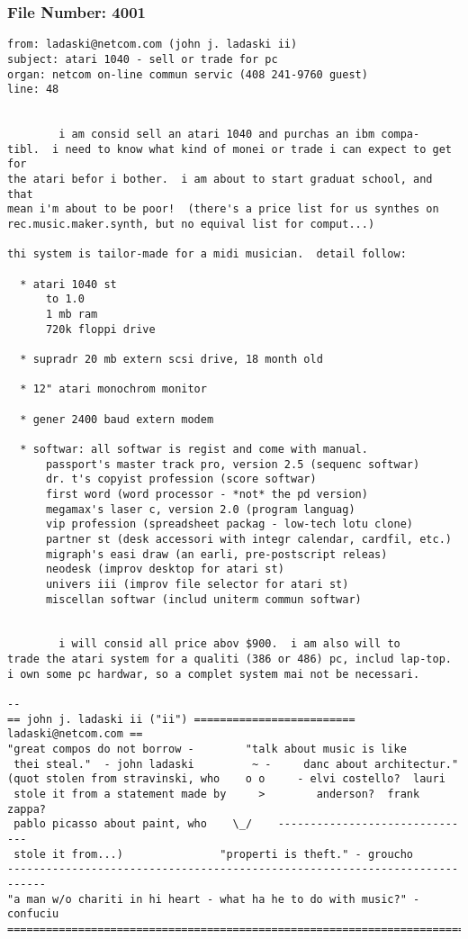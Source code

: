\subsubsection*{File Number: 4001}
\scriptsize\begin{verbatim}
from: ladaski@netcom.com (john j. ladaski ii)
subject: atari 1040 - sell or trade for pc
organ: netcom on-line commun servic (408 241-9760 guest)
line: 48


        i am consid sell an atari 1040 and purchas an ibm compa-
tibl.  i need to know what kind of monei or trade i can expect to get for
the atari befor i bother.  i am about to start graduat school, and that
mean i'm about to be poor!  (there's a price list for us synthes on
rec.music.maker.synth, but no equival list for comput...)

thi system is tailor-made for a midi musician.  detail follow:

  * atari 1040 st
      to 1.0
      1 mb ram
      720k floppi drive

  * supradr 20 mb extern scsi drive, 18 month old

  * 12" atari monochrom monitor

  * gener 2400 baud extern modem

  * softwar: all softwar is regist and come with manual.
      passport's master track pro, version 2.5 (sequenc softwar)
      dr. t's copyist profession (score softwar)
      first word (word processor - *not* the pd version)
      megamax's laser c, version 2.0 (program languag)
      vip profession (spreadsheet packag - low-tech lotu clone)
      partner st (desk accessori with integr calendar, cardfil, etc.)
      migraph's easi draw (an earli, pre-postscript releas)
      neodesk (improv desktop for atari st)
      univers iii (improv file selector for atari st)
      miscellan softwar (includ uniterm commun softwar)


        i will consid all price abov $900.  i am also will to
trade the atari system for a qualiti (386 or 486) pc, includ lap-top.
i own some pc hardwar, so a complet system mai not be necessari.

-- 
== john j. ladaski ii ("ii") ========================= ladaski@netcom.com ==
"great compos do not borrow -	     "talk about music is like
 thei steal."  - john ladaski	      ~ -     danc about architectur."
(quot stolen from stravinski, who    o o     - elvi costello?  lauri
 stole it from a statement made by     >        anderson?  frank zappa?
 pablo picasso about paint, who    \_/    -------------------------------
 stole it from...)			     "properti is theft." - groucho
----------------------------------------------------------------------------
"a man w/o chariti in hi heart - what ha he to do with music?" - confuciu
============================================================================
\end{verbatim}
